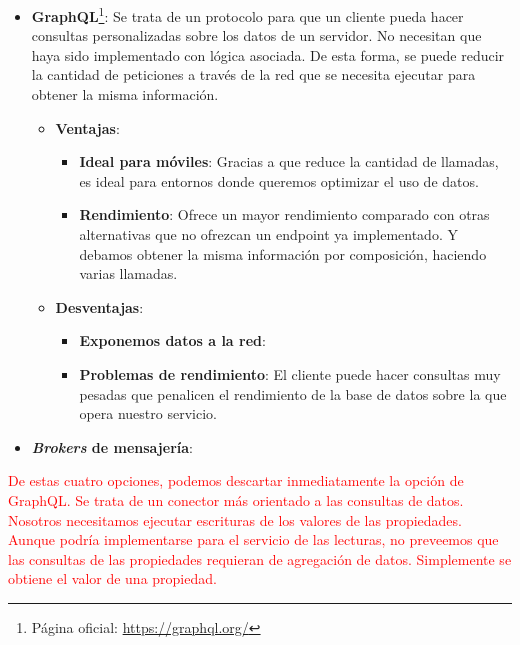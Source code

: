 \begin{itemize}
  \item \textbf{GraphQL}\footnote{Página oficial: \url{https://graphql.org/}}: Se trata de un protocolo para que un cliente pueda hacer consultas personalizadas sobre los datos de un servidor. No necesitan que haya sido implementado con lógica asociada. De esta forma, se puede reducir la cantidad de peticiones a través de la red que se necesita ejecutar para obtener la misma información.

  \begin{itemize}
    \item \textbf{Ventajas}:

    \begin{itemize}
      \item \textbf{Ideal para móviles}: Gracias a que reduce la cantidad de llamadas, es ideal para entornos donde queremos optimizar el uso de datos.

      \item \textbf{Rendimiento}: Ofrece un mayor rendimiento comparado con otras alternativas que no ofrezcan un endpoint ya implementado. Y debamos obtener la misma información por composición, haciendo varias llamadas.
    \end{itemize}
  \end{itemize}

  \begin{itemize}
    \item \textbf{Desventajas}:

    \begin{itemize}
      \item \textbf{Exponemos datos a la red}:

      \item \textbf{Problemas de rendimiento}: El cliente puede hacer consultas muy pesadas que penalicen el rendimiento de la base de datos sobre la que opera nuestro servicio.
    \end{itemize}
  \end{itemize}

  \item \textbf{\textit{Brokers} de mensajería}:
\end{itemize}

\textcolor{red}{De estas cuatro opciones, podemos descartar inmediatamente la opción de GraphQL. Se trata de un conector más orientado a las consultas de datos. Nosotros necesitamos ejecutar escrituras de los valores de las propiedades. Aunque podría implementarse para el servicio de las lecturas, no preveemos que las consultas de las propiedades requieran de agregación de datos. Simplemente se obtiene el valor de una propiedad.}

